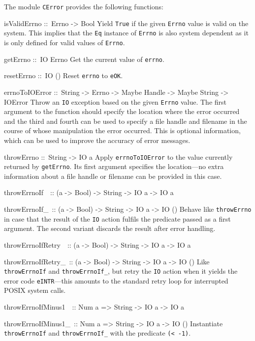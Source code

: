 \documentclass[a4paper,twosides]{article}
\makeatletter
\newcommand{\code}[1]{\texttt{#1}}      %
\newenvironment{codedesc}{%
  \list{}{\labelwidth\z@
    \let\makelabel\codedesclabel}
  }{%
  \endlist
  }
\newcommand*{\codedesclabel}[1]{%
  \hspace{-\leftmargin}
  \parbox[b]{\labelwidth}{\makebox[0pt][l]{\code{#1}}\\}\hfil\relax
  }
\newcommand{\combineitems}{\vspace*{-\itemsep}\vspace*{-\parsep}\vspace*{-1em}}
\makeatother
\begin{document}
The module \code{CError} provides the following functions:
%
\begin{codedesc}
\item[isValidErrno ::\ Errno -> Bool] Yield \code{True} if the given
  \code{Errno} value is valid on the system.  This implies that the \code{Eq}
  instance of \code{Errno} is also system dependent as it is only defined for
  valid values of \code{Errno}.

\item[getErrno ::\ IO Errno] Get the current value of \code{errno}.

\item[resetErrno ::\ IO ()] Reset \code{errno} to \code{eOK}.
  
\item[errnoToIOError ::\ String -> Errno -> Maybe Handle -> Maybe String ->
  IOError] Throw an \code{IO} exception based on the given \code{Errno} value.
  The first argument to the function should specify the location where the
  error occurred and the third and fourth can be used to specify a file handle
  and filename in the course of whose manipulation the error occurred.  This is
  optional information, which can be used to improve the accuracy of error
  messages.  
  
\item[throwErrno ::\ String -> IO a] Apply \code{errnoToIOError} to the value
  currently returned by \code{getErrno}.  Its first argument specifies the
  location---no extra information about a file handle or filename can be
  provided in this case.

\item[throwErrnoIf~~:: (a -> Bool) -> String -> IO a -> IO a]
\item[throwErrnoIf\_~:: (a -> Bool) -> String -> IO a -> IO ()]\combineitems
  Behave like \code{throwErrno} in case that the result of the \code{IO}
  action fulfils the predicate passed as a first argument.  The second variant
  discards the result after error handling.

\item[throwErrnoIfRetry~~:: (a -> Bool) -> String -> IO a -> IO a]
\item[throwErrnoIfRetry\_~:: (a -> Bool) -> String -> IO a -> IO ()]%
\combineitems Like \code{throwErrnoIf} and \code{throwErrnoIf\_}, but retry
the \code{IO} action when it yields the error code \code{eINTR}---this amounts
to the standard retry loop for interrupted POSIX system calls.

\item[throwErrnoIfMinus1~~:: Num a => String -> IO a -> IO a]
\item[throwErrnoIfMinus1\_~:: Num a => String -> IO a -> IO ()]\combineitems
  Instantiate \code{throwErrnoIf} and \code{throwErrnoIf\_} with the predicate
  \code{(< -1)}.


\end{codedesc}
\end{document}
